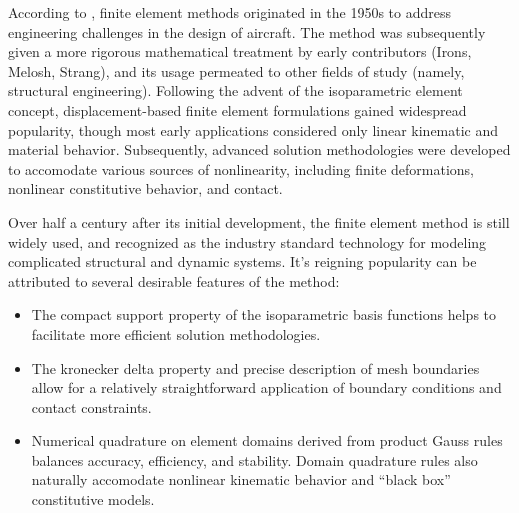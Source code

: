 	According to \cite{Felippa:04}, finite element methods originated in the 1950s to address engineering challenges in the design of aircraft. The method was subsequently given a more rigorous mathematical treatment by early contributors (Irons, Melosh, Strang), and its usage permeated to other fields of study (namely, structural engineering). Following the advent of the isoparametric element concept, displacement-based finite element formulations gained widespread popularity, though most early applications considered only linear kinematic and material behavior.
	Subsequently, advanced solution methodologies were developed to accomodate various sources of nonlinearity, including finite deformations, nonlinear constitutive behavior, and contact.

	Over half a century after its initial development, the finite element method is still widely used, and recognized as the industry standard technology for modeling complicated structural and dynamic systems. It's reigning popularity can be attributed to several desirable features of the method:
	\begin{itemize}
		\item The compact support property of the isoparametric basis functions helps to facilitate more efficient solution methodologies.
		\item The kronecker delta property and precise description of mesh boundaries allow for a relatively straightforward application of boundary conditions and contact constraints.
		\item Numerical quadrature on element domains derived from product Gauss rules balances accuracy, efficiency, and stability. Domain quadrature rules also naturally accomodate nonlinear kinematic behavior and ``black box'' constitutive models.
	\end{itemize}	
	
